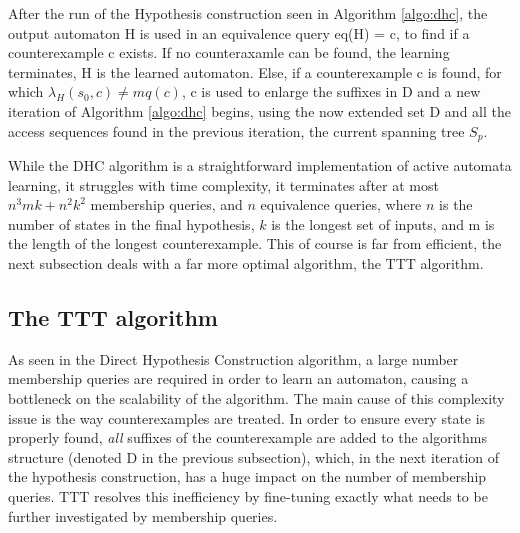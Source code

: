 After the run of the Hypothesis construction seen in Algorithm \ref{algo:dhc}, the output automaton H is used in an equivalence query eq(H) = c, to find if a counterexample c exists. If no counteraxamle can be found, the learning terminates, H is the learned automaton. Else, if a counterexample c is found, for which $\lambda_H(s_0,c) \neq mq(c)$, c is used to enlarge the suffixes in D and a new iteration of Algorithm \ref{algo:dhc} begins, using the now extended set D and all the access sequences found in the previous iteration, the current spanning tree $S_p$.

While the DHC algorithm is a straightforward implementation of active automata learning, it struggles with time complexity, it terminates after at most $n^3mk+n^2k^2$ membership queries, and $n$ equivalence queries, where $n$ is the number of states in the final hypothesis, $k$ is the longest set of inputs, and m is the length of the longest counterexample. This of course is far from efficient, the next subsection deals with a far more optimal algorithm, the TTT algorithm.

\subsection{The TTT algorithm\cite{10.1007/978-3-319-11164-3_26}}

As seen in the Direct Hypothesis Construction algorithm, a large number membership queries are required in order to learn an automaton, causing a bottleneck on the scalability of the algorithm. The main cause of this complexity issue is the way counterexamples are treated. In order to ensure every state is properly found, \textit{all} suffixes of the counterexample are added to the algorithms structure (denoted D in the previous subsection), which, in the next iteration of the hypothesis construction, has a huge impact on the number of membership queries. TTT resolves this inefficiency by fine-tuning exactly what needs to be further investigated by membership queries.\\\\

